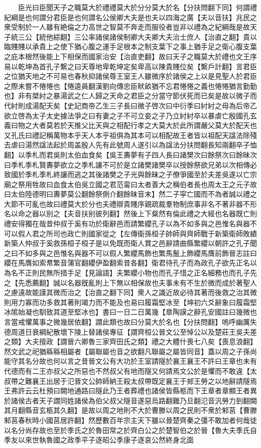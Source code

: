 　　臣光曰臣聞天子之職莫大於禮禮莫大於分分莫大於名【分扶問翻下同】何謂禮紀綱是也何謂分君臣是也何謂名公侯卿大夫是也夫以四海之廣【夫以音扶】兆民之衆受制於一人雖有絶倫之力高世之智莫不奔走而服役者豈非以禮為之紀綱哉是故天子統三公【統他綜翻】三公率諸侯諸侯制卿大夫卿大夫治士庶人【治直之翻】貴以臨賤賤以承貴上之使下猶心腹之運手足根本之制支葉下之事上猶手足之衛心腹支葉之庇本根然後能上下相保而國家治安【治直吏翻】故曰天子之職莫大於禮也文王序易以乾坤為首孔子繫之曰天尊地卑乾坤定矣卑高以陳貴賤位矣【繫戶計翻】言君臣之位猶天地之不可易也春秋抑諸侯尊王室王人雖微序於諸侯之上以是見聖人於君臣之際未嘗不惓惓也【惓逵員翻漢劉向傳忠臣畎畝猶不忘君惓惓之義也惓惓猶言勤勤也】非有桀紂之暴湯武之仁人歸之天命之君臣之分當守節伏死而已矣是故以微子而代紂則成湯配天矣【史記商帝乙生三子長曰微子啓次曰中衍季曰紂紂之母為后帝乙欲立啓為太子太史據法爭之曰有妻之子不可立妾之子乃立紂紂卒以暴虐亡殷國孔玄義曰物之大者莫若於天推父比天與之相配行孝之大莫大於此所謂嚴父莫大於配天也又孔氏曰禮記稱萬物本乎天人本乎祖俱為其本可以相配故王者皆以祖配天諡法除殘去虐曰湯然諡法起於周盖殷人先有此號周人遂引以為諡法分扶問翻長知兩翻卒子恤翻】以季札而君吳則太伯血食矣【吳王夀夢有子四人長曰諸樊次曰餘祭次曰餘昧次曰季札季札賢夀夢欲立之季札讓不可於是立諸樊諸樊卒以授餘祭欲兄弟以次相傳必致國於季札季札終讓而逃之其後諸樊之子光與餘昧之子僚爭國至於夫差吳遂以亡宗廟之祭用牲故曰血食太伯吳立國之君范甯曰太者善大之稱伯者長也周太王之元子故曰太伯陸德明曰夀夢莫公翻餘祭側介翻餘昧音末】然二子寜亡國而不為者誠以禮之大節不可亂也故曰禮莫大於分也夫禮辯貴賤序親疏裁羣物制庶事非名不著非器不形名以命之器以别之【夫音扶别彼列翻】然後上下粲然有倫此禮之大經也名器既亡則禮安得獨在哉昔仲叔于奚有功於衛辭邑而請繁纓孔子以為不如多與之邑惟名與器不可以假人君之所司也政亡則國家從之【左傳衛孫桓子帥師與齊師戰于新築衛師敗績新築人仲叔于奚救孫桓子桓子是以免既而衛人賞之邑辭請曲縣繁纓以朝許之孔子聞之曰不如多與之邑惟名與器不可以假人繁纓馬飾也繁馬鬛上飾纓馬膺前飾晉志註曰纓在馬膺如索帬繁音蒲官翻纓伊盈翻索昔各翻】衛君待孔子而為政孔子欲先正名以為名不正則民無所措手足【見論語】夫繁纓小物也而孔子惜之正名細務也而孔子先之【先悉薦翻】誠以名器旣亂則上下無以相保故也夫事未有不生於微而成於著聖人之慮遠故能謹其微而治之【治直之翻下同】衆人之識近故必待其著而後救之治其微則用力寡而功多救其著則竭力而不能及也易曰履霜堅冰至【坤初六爻辭象曰履霜堅冰隂始凝也馴致其道至堅冰也】書曰一日二日萬幾【臯陶謨之辭孔安國註曰幾微也言當戒懼萬事之微幾居依翻】謂此類也故曰分莫大於名也【分扶問翻】嗚呼幽厲失德周道日衰綱紀散壞下陵上替諸侯專征【謂齊桓公晉文公至悼公以及楚莊王吳夫差之類】大夫擅政【謂晉六卿魯三家齊田氏之類】禮之大體什喪七八矣【喪息浪翻】然文武之祀猶緜緜相屬者【屬聯屬也音之欲翻凡聯屬之屬皆同音】蓋以周之子孫尚能守其名分故也何以言之昔晉文公有大功於王室請隧於襄王襄王不許曰王章也未有代德而有二王亦叔父之所惡也不然叔父有地而隧又何請焉文公於是懼而不敢違【太叔帶之難襄王出居于氾晉文公帥師納王殺太叔帶既定襄王于郟王勞之以地辭請隧焉王弗許云云杜預曰闕地通路曰隧此乃王者葬禮也諸侯皆縣柩而下王章者章顯王者異於諸侯古者天子謂同姓諸侯為伯父叔父隧音遂惡烏路翻難乃旦翻氾音汎勞力到翻闕其月翻縣音玄柩其久翻】是故以周之地則不大於曹滕以周之民則不衆於邾莒【曹滕邾莒春秋時小國莒居許翻】然歷數百年宗主天下雖以晉楚齊秦之彊不敢加者何哉徒以名分尚存故也至於季氏之於魯田常之於齊白公之於楚智伯之於晉【魯大夫季氏自季友以來世執魯國之政季平子逐昭公季康子逐哀公然終身北面